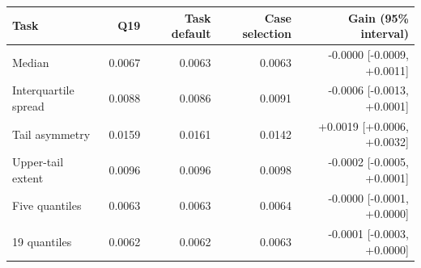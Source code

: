 \begin{tabular}{lrrrr}\toprule
Task & Q19 & Task default & Case selection & Gain (95\% interval)\\\midrule
Median & 0.0067 & 0.0063 & 0.0063 & -0.0000 [-0.0009, +0.0011]\\
Interquartile spread & 0.0088 & 0.0086 & 0.0091 & -0.0006 [-0.0013, +0.0001]\\
Tail asymmetry & 0.0159 & 0.0161 & 0.0142 & +0.0019 [+0.0006, +0.0032]\\
Upper-tail extent & 0.0096 & 0.0096 & 0.0098 & -0.0002 [-0.0005, +0.0001]\\
Five quantiles & 0.0063 & 0.0063 & 0.0064 & -0.0000 [-0.0001, +0.0000]\\
19 quantiles & 0.0062 & 0.0062 & 0.0063 & -0.0001 [-0.0003, +0.0000]\\
\bottomrule\end{tabular}
